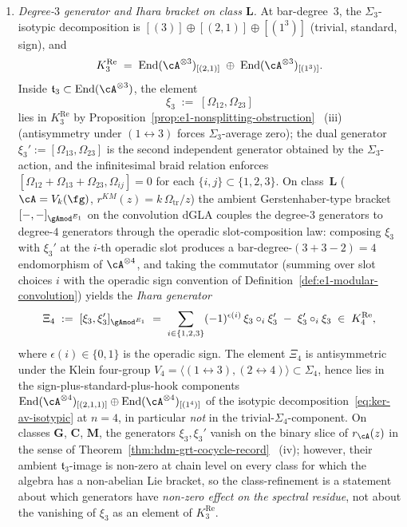 \begin{theorem}
\begin{enumerate}[label=\textup{(\roman*)}]
\item \emph{Degree-$3$ generator and Ihara bracket on class $\mathbf{L}$.}
At bar-degree~$3$, the $\Sigma_3$-isotypic decomposition is
$[(3)]\oplus[(2,1)]\oplus[(1^3)]$ (trivial, standard, sign), and
\[
 K^{\mathrm{Re}}_3
 \;=\;
 \operatorname{End}(\cA^{\otimes 3})_{[(2,1)]}
 \;\oplus\;
 \operatorname{End}(\cA^{\otimes 3})_{[(1^3)]}.
\]
Inside $\mathfrak{t}_3\subset\operatorname{End}(\cA^{\otimes 3})$,
the element
\begin{equation}\label{eq:ker-av-deg3-generator}
 \xi_3\;:=\;[\Omega_{12},\Omega_{23}]
\end{equation}
lies in \(K^{\mathrm{Re}}_3\) by
Proposition~\textup{\ref{prop:e1-nonsplitting-obstruction}}~%
\textup{(iii)} (antisymmetry under $(1\leftrightarrow 3)$ forces
$\Sigma_3$-average zero); the dual generator
$\xi_3':=[\Omega_{13},\Omega_{23}]$ is the second independent
generator obtained by the $\Sigma_3$-action, and the infinitesimal
braid relation enforces
$[\Omega_{12}+\Omega_{13}+\Omega_{23},\Omega_{ij}]=0$ for each
$\{i,j\}\subset\{1,2,3\}$. On class~$\mathbf{L}$
\textup{(}$\cA=V_k(\fg)$, $r^{KM}(z)=k\,\Omega_{\mathrm{tr}}/z$\textup{)} the
ambient Gerstenhaber-type bracket
$[-,-]_{{\gAmod}^{E_1}}$ on the convolution dGLA couples the
degree-$3$ generators to degree-$4$ generators through the
operadic slot-composition law: composing $\xi_3$ with $\xi_3'$ at
the $i$-th operadic slot produces a bar-degree-$(3+3-2)=4$
endomorphism of $\cA^{\otimes 4}$, and taking the commutator
(summing over slot choices $i$ with the operadic sign convention
of Definition~\textup{\ref{def:e1-modular-convolution}}) yields
the \emph{Ihara generator}
\begin{equation}\label{eq:ihara-bracket-deg4}
 \Xi_{4}\;:=\;
 [\xi_3,\xi_3']_{{\gAmod}^{E_1}}
 \;=\;
 \sum_{i\in\{1,2,3\}}
 (-1)^{\epsilon(i)}\,
 \xi_3\circ_i\xi_3'
 \;-\;
\xi_3'\circ_i\xi_3
\;\in\;
K^{\mathrm{Re}}_4,
\end{equation}
where $\epsilon(i)\in\{0,1\}$ is the operadic sign. The element
$\Xi_4$ is antisymmetric under the Klein four-group
$V_4=\langle(1\leftrightarrow 3),(2\leftrightarrow 4)\rangle
\subset\Sigma_4$, hence lies in the sign-plus-standard-plus-hook
components
$\operatorname{End}(\cA^{\otimes 4})_{[(2,1,1)]}\oplus
\operatorname{End}(\cA^{\otimes 4})_{[(1^4)]}$ of the isotypic
decomposition~\eqref{eq:ker-av-isotypic} at $n=4$, in particular
\emph{not} in the trivial-$\Sigma_4$-component. On classes
$\mathbf{G}$, $\mathbf{C}$, $\mathbf{M}$, the generators
$\xi_3,\xi_3'$ vanish on the binary slice of $r_\cA(z)$ in the
sense of Theorem~\textup{\ref{thm:hdm-grt-cocycle-record}}~%
\textup{(iv)}; however, their ambient $\mathfrak{t}_3$-image is
non-zero at chain level on every class for which the algebra has a
non-abelian Lie bracket, so the class-refinement is a statement
about which generators have \emph{non-zero effect on the spectral
residue}, not about the vanishing of $\xi_3$ as an element of
\(K^{\mathrm{Re}}_3\).


\end{enumerate}
\end{theorem}
